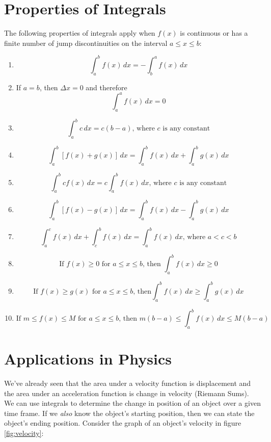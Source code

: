 \section{Properties of Integrals}
The following properties of integrals apply when $f(x)$ is continuous 
or has a finite number of jump discontinuities on the interval $a 
\leq x \leq b$:
\begin{enumerate}
\item $$\int_{a}^{b} f(x)\,dx = - \int_{b}^{a} f(x)\,dx$$ 
\item If $a = b$, then $\Delta x = 0$ and therefore $$\int_{a}^{a} 
f(x)\,dx = 0$$%
\item $$\int_{a}^{b} c\,dx = c (b - a) \text{, where } c 
\text{ is any constant}$$%
\item $$\int_{a}^{b}[f(x) + g(x)]\,dx = \int_{a}^{b} f(x)\,dx + 
\int_{a}^{b} g(x)\,dx$$%
\item $$\int_{a}^{b} c f(x)\,dx = c \int_{a}^{b} f(x)\,dx
\text{, where } c \text{ is any constant}$$%
\item $$\int_{a}^{b}[f(x) - g(x)]\,dx = \int_{a}^{b} f(x)\,dx - 
\int_{a}^{b} g(x)\,dx$$%
\item $$\int_{a}^{c} f(x)\,dx + \int_{c}^{b} f(x)\,dx = 
\int_{a}^{b} f(x)\,dx \text{, where } a < c < b$$%
\item $$\text{If } f(x) \geq 0 \text{ for } a \leq x \leq b 
\text{, then } \int_{a}^{b} f(x)\,dx \geq 0$$%
\item $$\text{If } f(x) \geq g(x) \text{ for } a \leq x \leq b 
\text{, then} \int_{a}^{b} f(x)\,dx \geq \int_{a}^{b} g(x)\,dx$$
\item $$\text{If } m \leq f(x) \leq M \text{ for }a \leq x \leq b 
\text{, then } m (b - a) \leq \int_{a}^{b} f(x)\,dx \leq M (b - a)$$
\end{enumerate}



\section{Applications in Physics}
We've already seen that the area under a velocity function is 
displacement and the area under an acceleration function is change in 
velocity (Riemann Sums). We can use integrals to determine the change 
in position of an object over a given time frame. If we \textit{also} 
know the object's starting position, then we can state the object's 
ending position. Consider the graph of an object's velocity in figure 
\ref{fig:velocity}:


